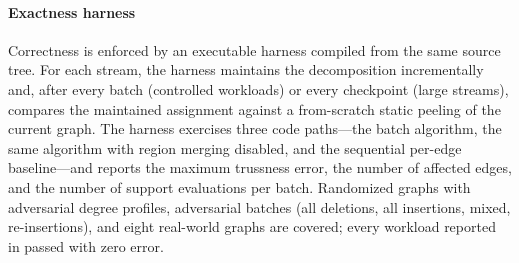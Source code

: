 \paragraph{Exactness harness}
Correctness is enforced by an executable harness compiled from the same source tree.
For each stream, the harness maintains the decomposition incrementally and, after every batch (controlled workloads) or every checkpoint (large streams), compares the maintained assignment against a from-scratch static peeling of the current graph.
The harness exercises three code paths---the batch algorithm, the same algorithm with region merging disabled, and the sequential per-edge baseline---and reports the maximum trussness error, the number of affected edges, and the number of support evaluations per batch.
Randomized graphs with adversarial degree profiles, adversarial batches (all deletions, all insertions, mixed, re-insertions), and eight real-world graphs are covered; every workload reported in  passed with zero error.
